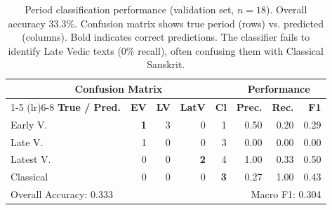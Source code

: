 \begin{table}[ht]
\centering
\caption{Period classification performance (validation set, $n=18$). Overall accuracy 33.3\%. Confusion matrix shows true period (rows) vs. predicted (columns). Bold indicates correct predictions. The classifier fails to identify Late Vedic texts (0\% recall), often confusing them with Classical Sanskrit.}
\label{tab:period-classifier}
\small
\begin{tabular}{lrrrr|rrr}
\toprule
\multicolumn{5}{c}{\textbf{Confusion Matrix}} & \multicolumn{3}{c}{\textbf{Performance}} \\
\cmidrule(lr){1-5} \cmidrule(lr){6-8}
\textbf{True / Pred.} & \textbf{EV} & \textbf{LV} & \textbf{LatV} & \textbf{Cl} & \textbf{Prec.} & \textbf{Rec.} & \textbf{F1} \\
\midrule
Early V. & \textbf{1} & 3 & 0 & 1 & 0.50 & 0.20 & 0.29 \\
Late V. & 1 & 0 & 0 & 3 & 0.00 & 0.00 & 0.00 \\
Latest V. & 0 & 0 & \textbf{2} & 4 & 1.00 & 0.33 & 0.50 \\
Classical & 0 & 0 & 0 & \textbf{3} & 0.27 & 1.00 & 0.43 \\
\midrule
\multicolumn{5}{l}{Overall Accuracy: 0.333} & \multicolumn{3}{r}{Macro F1: 0.304} \\
\bottomrule
\end{tabular}
\end{table}